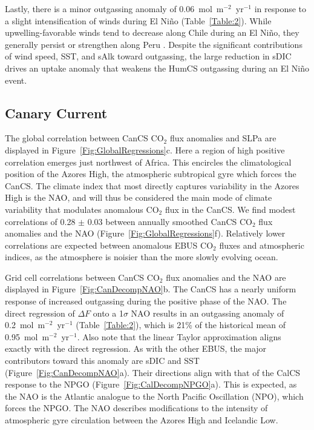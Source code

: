 \documentclass[hvmath, online,bgd]{copernicus_discussions}
\begin{document}
Lastly, there is a minor outgassing anomaly of 0.06~mol~m$^{-2}$~yr$^{-1}$ in response to a slight intensification of winds during El Ni\~no (Table~\ref{Table:2}). While upwelling-favorable winds tend to decrease along Chile during an El Ni\~no, they generally persist or strengthen along Peru \citep{Wyrtki:1975, Enfield:1981, Huyer:1987}. Despite the significant contributions of wind speed, SST, and sAlk toward outgassing, the large reduction in sDIC drives an uptake anomaly that weakens the HumCS outgassing during an El Ni\~no event.

\subsection{Canary Current}
The global correlation between CanCS CO$_{2}$ flux anomalies and SLPa are displayed in Figure~\ref{Fig:GlobalRegressions}c. Here a region of high positive correlation emerges just northwest of Africa. This encircles the climatological position of the Azores High, the atmospheric subtropical gyre which forces the CanCS. The climate index that most directly captures variability in the Azores High is the NAO, and will thus be considered the main mode of climate variability that modulates anomalous CO$_{2}$ flux in the CanCS. We find modest correlations of 0.28 $\pm$ 0.03 between annually smoothed CanCS CO$_{2}$ flux anomalies and the NAO (Figure~\ref{Fig:GlobalRegressions}f). Relatively lower correlations are expected between anomalous EBUS CO$_{2}$ fluxes and atmospheric indices, as the atmosphere is noisier than the more slowly evolving ocean.

Grid cell correlations between CanCS CO$_{2}$ flux anomalies and the NAO are displayed in Figure~\ref{Fig:CanDecompNAO}b. The CanCS has a nearly uniform response of increased outgassing during the positive phase of the NAO. The direct regression of $\Delta F$ onto a 1$\sigma$ NAO results in an outgassing anomaly of 0.2~mol~m$^{-2}$~yr$^{-1}$ (Table~\ref{Table:2}), which is 21\% of the historical mean of 0.95~mol~m$^{-2}$~yr$^{-1}$. Also note that the linear Taylor approximation aligns exactly with the direct regression. As with the other EBUS, the major contributors toward this anomaly are sDIC and SST (Figure~\ref{Fig:CanDecompNAO}a). Their directions align with that of the CalCS response to the NPGO (Figure~\ref{Fig:CalDecompNPGO}a). This is expected, as the NAO is the Atlantic analogue to the North Pacific Oscillation (NPO), which forces the NPGO. The NAO describes modifications to the intensity of atmospheric gyre circulation between the Azores High and Icelandic Low. 
\end{document}

